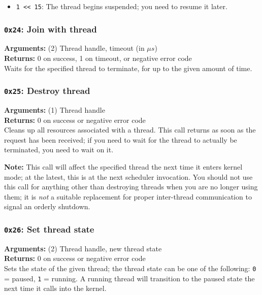 \documentclass[11pt]{article}
\begin{document}
\begin{itemize}
\item \texttt{1 << 15}: The thread begins suspended; you need to resume it later.
\end{itemize}

\subsubsection{{\tt 0x24}: Join with thread}
\textbf{Arguments:} (2) Thread handle, timeout (in $\mu s$) \\
\textbf{Returns:} 0 on success, 1 on timeout, or negative error code \\

Waits for the specified thread to terminate, for up to the given amount of time.

\subsubsection{{\tt 0x25}: Destroy thread}
\textbf{Arguments:} (1) Thread handle \\
\textbf{Returns:} 0 on success or negative error code \\

Cleans up all resources associated with a thread. This call returns as soon as the request has been received; if you need to wait for the thread to actually be terminated, you need to wait on it.

\textbf{Note:} This call will affect the specified thread the next time it enters kernel mode; at the latest, this is at the next scheduler invocation. You should not use this call for anything other than destroying threads when you are no longer using them; it is \textit{not} a suitable replacement for proper inter-thread communication to signal an orderly shutdown.

\subsubsection{{\tt 0x26}: Set thread state}
\textbf{Arguments:} (2) Thread handle, new thread state \\
\textbf{Returns:} 0 on success or negative error code \\

Sets the state of the given thread; the thread state can be one of the following: \texttt{0} = paused, \texttt{1} = running. A running thread will transition to the paused state the next time it calls into the kernel.
\end{document}
